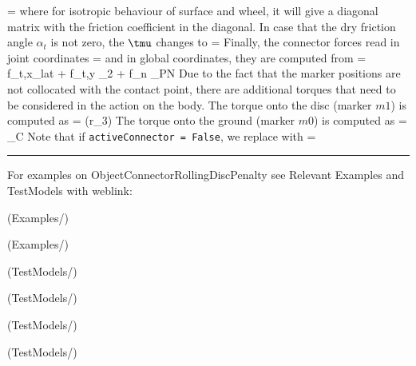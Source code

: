     \be
       = 
    \ee
    where for isotropic behaviour of surface and wheel, it will give a diagonal matrix with the friction coefficient in the diagonal.
    In case that the dry friction angle $\alpha_t$ is not zero, the $\tmu$ changes to
    \be
       =  
    \ee
    Finally, the connector forces read in joint coordinates
    \be \label{eq:ConnectorRollingDiscPenalty:forces}
       = 
    \ee
    and in global coordinates, they are computed from
    \be
       = f_{t,x}_{lat} + f_{t,y} _2 + f_n _{PN}
    \ee
    Due to the fact that the marker positions are not collocated with the contact point, 
    there are additional torques that need to be considered in the action on the body.
    The torque onto the disc (marker $m1$) is computed as
    \be
       = (r\cdot {}_3) \times {}
    \ee
    The torque onto the ground (marker $m0$) is computed as
    \be
       = _{C} \times {}
    \ee
    Note that if \texttt{activeConnector = False}, we replace  with
    \be
       = \Null
    \ee
\vspace{6pt}\par\noindent\rule{\textwidth}{0.4pt}
%
\noindent For examples on ObjectConnectorRollingDiscPenalty see Relevant Examples and TestModels with weblink:
\bi
\item {} (Examples/)
\item {} (Examples/)
\item {} (TestModels/)
\item {} (TestModels/)
\item {} (TestModels/)
\item {} (TestModels/)


